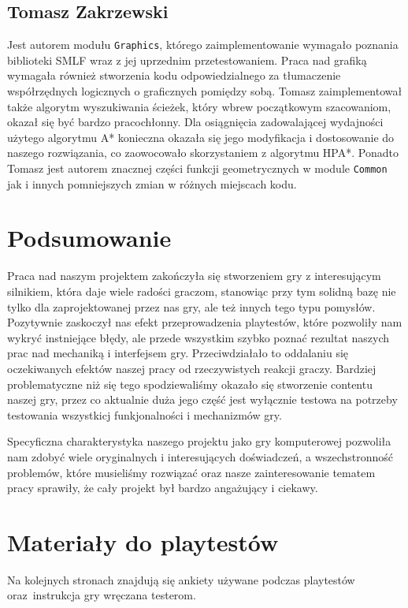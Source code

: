 \documentclass[licencjacka]{pracamgr}
\begin{document}
  \section{Tomasz Zakrzewski}
    Jest autorem modułu \texttt{Graphics}, którego zaimplementowanie wymagało poznania biblioteki SMLF wraz z jej uprzednim przetestowaniem.
    Praca nad grafiką wymagała również stworzenia kodu odpowiedzialnego za tłumaczenie współrzędnych logicznych o graficznych pomiędzy sobą.
    Tomasz zaimplementował także algorytm wyszukiwania ścieżek, który wbrew początkowym szacowaniom, okazał się być bardzo pracochłonny.
    Dla osiągnięcia zadowalającej wydajności użytego algorytmu A* konieczna okazała się jego modyfikacja i dostosowanie do naszego rozwiązania,
    co zaowocowało skorzystaniem z algorytmu HPA*. Ponadto Tomasz jest autorem znacznej części funkcji geometrycznych w module \texttt{Common}
    jak i innych pomniejszych zmian w różnych miejscach kodu.

\chapter{Podsumowanie}
  Praca nad naszym projektem zakończyła się stworzeniem gry z interesującym silnikiem, która daje wiele radości graczom,
  stanowiąc przy tym solidną bazę nie tylko dla zaprojektowanej przez nas gry, ale też innych tego typu pomysłów.
  Pozytywnie zaskoczył nas efekt przeprowadzenia playtestów, które pozwoliły nam wykryć instniejące błędy, 
  ale przede wszystkim szybko poznać rezultat naszych prac nad mechaniką i interfejsem gry. Przeciwdziałało to oddalaniu
  się oczekiwanych efektów naszej pracy od rzeczywistych reakcji graczy. Bardziej problematyczne niż się tego
  spodziewaliśmy okazało się stworzenie contentu naszej gry, przez co aktualnie duża jego część jest wyłącznie testowa na
  potrzeby testowania wszystkicj funkjonalności i mechanizmów gry. 

  Specyficzna charakterystyka naszego projektu jako gry komputerowej pozwoliła nam zdobyć wiele oryginalnych i interesujących
  doświadczeń, a wszechstronność problemów, które musieliśmy rozwiązać oraz nasze zainteresowanie tematem pracy sprawiły,
  że cały projekt był bardzo angażujący i ciekawy.


\appendix

\chapter{Materiały do playtestów}
  Na kolejnych stronach znajdują się ankiety używane podczas playtestów
  oraz~instrukcja gry wręczana testerom.
\end{document}
